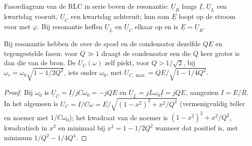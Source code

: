 \begin{omfigure}

{\small Fasordiagram van de RLC in serie boven de resonantie: $\underline U_R$
langs $\underline I$, $\underline U_L$ een kwartslag vooruit, $\underline U_C$
een kwartslag achteruit; hun som $\underline E$ loopt op de stroom voor met
$\varphi$. Bij resonantie heffen $\underline U_L$ en $\underline U_C$ elkaar op en is
$\underline E = \underline U_R$.}
\end{omfigure}

\begin{proposition}[Spanningsopslingering]\label{prop:b1:sinusoidal-impedance:overvoltage}
Bij resonantie hebben de  over de spoel en de condensator dezelfde
 $QE$ en tegengestelde fasen: voor $Q \gg 1$ draagt de condensator
een  die $Q$ keer groter is dan die van de bron. De 
$U_C(\omega)$ zelf piekt, voor $Q > 1/\sqrt2$, bij $\omega_r =
\omega_0\sqrt{1 - 1/2Q^2}$, iets onder $\omega_0$, met
$U_{C,\max} = QE/\sqrt{1 - 1/4Q^2}$.
\end{proposition}

\begin{proof}
Bij $\omega_0$ is $\underline U_C = \underline I/jC\omega_0 = -jQE$ en
$\underline U_L = jL\omega_0\underline I = jQE$, aangezien $I = E/R$. In het
algemeen is $U_C = I/C\omega = E/\sqrt{(1 - x^2)^2 + x^2/Q^2}$ (vermenigvuldig
teller en noemer met $1/C\omega_0$); het kwadraat van de noemer
is $(1 - x^2)^2 + x^2/Q^2$, kwadratisch in $x^2$ en minimaal bij $x^2 =
1 - 1/2Q^2$ wanneer dat positief is, met minimum $1/Q^2 - 1/4Q^4$.
\end{proof}

